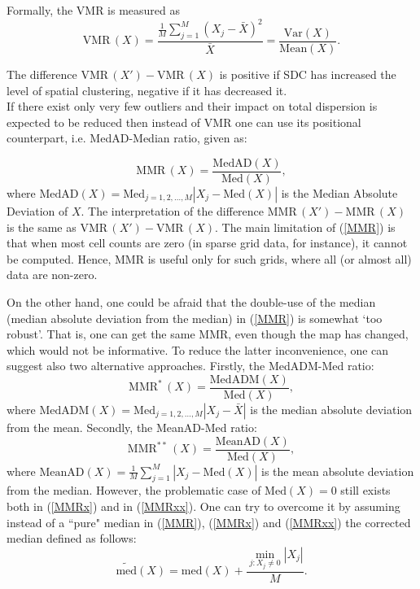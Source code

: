 Formally, the VMR is measured as
\begin{equation}
    \mathrm{VMR}\,(X) = \frac{\frac{1}{M}\sum_{j = 1}^M (X_j - \bar{X})^2}{\bar{X}} = \frac{\mathrm{Var}(X)}{\mathrm{Mean}(X)}.
\end{equation}

The difference $\mathrm{VMR}\,(X') - \mathrm{VMR}\,(X)$ is positive if SDC has increased the level of spatial clustering, negative if it has decreased it.\\

If there exist only very few outliers and their impact on total dispersion is expected to be reduced then instead of $\mathrm{VMR}$ one can use its positional counterpart, i.e. MedAD-Median ratio, given as:

\begin{equation}
    \mathrm{MMR}\,(X) = \frac{\mathrm{MedAD}(X)}{\mathrm{Med}(X)},
\label{MMR}
\end{equation}
where $\mathrm{MedAD}(X)=\mathrm{Med}_{j=1,2,\ldots,M}|X_j-\mathrm{Med}(X)|$ is the Median Absolute Deviation of $X$. The interpretation of the difference $\mathrm{MMR}\,(X') - \mathrm{MMR}\,(X)$ is the same as $\mathrm{VMR}\,(X') - \mathrm{VMR}\,(X)$. The main limitation of (\ref{MMR}) is that when most cell counts are zero (in sparse grid data, for instance), it cannot be computed. Hence, MMR is useful only for such grids, where all (or almost all) data are non-zero.

On the other hand, one could be afraid that the double-use of the median (median absolute deviation from the median) in (\ref{MMR}) is somewhat `too robust'. That is, one can get the same MMR, even though the map has changed, which would not be informative.
To reduce the latter inconvenience, one can suggest also two alternative approaches. Firstly, the MedADM-Med ratio:
\begin{equation}
    \mathrm{MMR^*}\,(X) = \frac{\mathrm{MedADM}(X)}{\mathrm{Med}(X)},
\label{MMRx}
\end{equation}
where $\mathrm{MedADM}(X)=\mathrm{Med}_{j=1,2,\ldots,M}|X_j-\bar{X}|$ is the median absolute deviation from the mean. Secondly, the MeanAD-Med ratio:
\begin{equation}
    \mathrm{MMR^{**}}\,(X) = \frac{\mathrm{MeanAD}(X)}{\mathrm{Med}(X)},
\label{MMRxx}
\end{equation}
where 
$\mathrm{MeanAD}(X)= \frac{1}{M} \sum_{j=1}^M |X_j-\mathrm{Med}(X)|$ is the mean absolute deviation from the median.
However, the problematic case of $\mathrm{Med}(X) = 0$ still exists both in (\ref{MMRx}) and in (\ref{MMRxx}). One can try to overcome it by assuming instead of a ``pure" median in (\ref{MMR}), (\ref{MMRx}) and (\ref{MMRxx}) the corrected median defined as follows:
\begin{equation}
\mathrm{\widetilde{med}}(X)=\mathrm{med}(X)+\frac{\mathop{\min}\limits_{j:X_{j}\ne 0}{|X_{j}|}}{M}.
\label{MEDc}
\end{equation}

